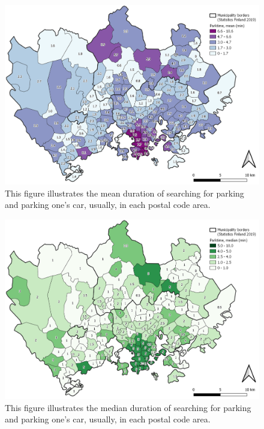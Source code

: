 \begin{figure}[H]%
    \centering
    \includegraphics[width=.88\textwidth]{images/thesis_postalvis_parkmean.png}
    \caption[Parktime, mean, in the reseach area]{This figure illustrates the mean duration of searching for parking and parking one's car, usually, in each postal code area.}%
    \label{fig:postalvis_parkmean}%
\end{figure}

\begin{figure}[H]%
    \centering
    \includegraphics[width=.88\textwidth]{images/thesis_postalvis_parkmedian.png}
    \caption[Parktime, median, in the reseach area]{This figure illustrates the median duration of searching for parking and parking one's car, usually, in each postal code area.}%
    \label{fig:postalvis_parkmedian}%
\end{figure}

